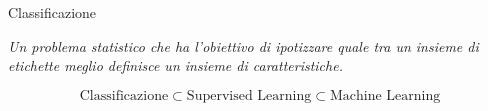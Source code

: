 \begin{tframe}{Classificazione}

    \textit{
        Un problema statistico che ha l'obiettivo di ipotizzare 
        quale tra un insieme di etichette meglio definisce un insieme di caratteristiche.
    }

    $$
        \text{Classificazione} 
            \subset 
        \text{Supervised Learning} 
            \subset 
        \text{Machine Learning}
    $$

    

\end{tframe}